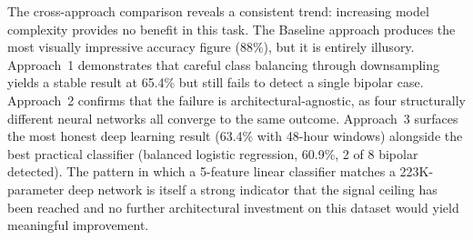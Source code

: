 The cross-approach comparison reveals a consistent trend: increasing model complexity provides no benefit in this task. The Baseline approach produces the most visually impressive accuracy figure (88\%), but it is entirely illusory. Approach~1 demonstrates that careful class balancing through downsampling yields a stable result at 65.4\% but still fails to detect a single bipolar case. Approach~2 confirms that the failure is architectural-agnostic, as four structurally different neural networks all converge to the same outcome. Approach~3 surfaces the most honest deep learning result (63.4\% with 48-hour windows) alongside the best practical classifier (balanced logistic regression, 60.9\%, 2 of 8 bipolar detected). The pattern in which a 5-feature linear classifier matches a 223K-parameter deep network is itself a strong indicator that the signal ceiling has been reached and no further architectural investment on this dataset would yield meaningful improvement.
